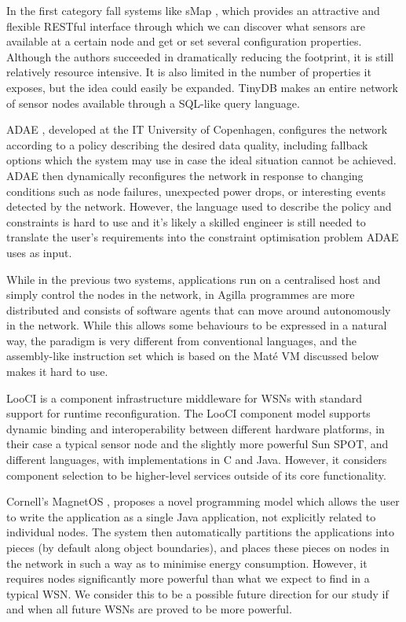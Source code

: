 In the first category fall systems like sMap \cite{DawsonHaggerty:2010eo}, which provides an attractive and flexible RESTful interface through which we can discover what sensors are available at a certain node and get or set several configuration properties. Although the authors succeeded in dramatically reducing the footprint, it is still relatively resource intensive. It is also limited in the number of properties it exposes, but the idea could easily be expanded. TinyDB \cite{Madden:2005tj} makes an entire network of sensor nodes available through a SQL-like query language.

ADAE \cite{Chang:2010ek}, developed at the IT University of Copenhagen, configures the network according to a policy describing the desired data quality, including fallback options which the system may use in case the ideal situation cannot be achieved. ADAE then dynamically reconfigures the network in response to changing conditions such as node failures, unexpected power drops, or interesting events detected by the network. However, the language used to describe the policy and constraints is hard to use and it's likely a skilled engineer is still needed to translate the user's requirements into the constraint optimisation problem ADAE uses as input.

While in the previous two systems, applications run on a centralised host and simply control the nodes in the network, in Agilla \cite{Fok:2005bh} programmes are more distributed and consists of software agents that can move around autonomously in the network. While this allows some behaviours to be expressed in a natural way, the paradigm is very different from conventional languages, and the assembly-like instruction set which is based on the Maté VM \cite{Levis:2002ku} discussed below makes it hard to use.

LooCI \cite{Hughes:dg} is a component infrastructure middleware for WSNs with standard support for runtime reconfiguration. The LooCI component model supports dynamic binding and interoperability between different hardware platforms, in their case a typical sensor node and the slightly more powerful Sun SPOT, and different languages, with implementations in C and Java. However, it considers component selection to be higher-level services outside of its core functionality.

Cornell's MagnetOS \cite{Liu:2005wsa}, proposes a novel programming model which allows the user to write the application as a single Java application, not explicitly related to individual nodes. The system then automatically partitions the applications into pieces (by default along object boundaries), and places these pieces on nodes in the network in such a way as to minimise energy consumption. However, it requires nodes significantly more powerful than what we expect to find in a typical WSN. We consider this to be a possible future direction for our study if and when all future WSNs are proved to be more powerful.

